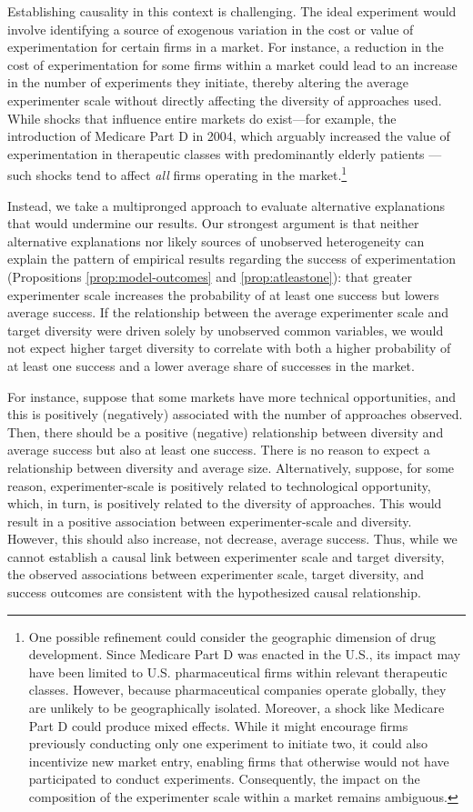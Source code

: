 Establishing causality in this context is challenging. The ideal experiment would involve identifying a source of exogenous variation in the cost or value of experimentation for certain firms in a market. For instance, a reduction in the cost of experimentation for some firms within a market could lead to an increase in the number of experiments they initiate, thereby altering the average experimenter scale without directly affecting the diversity of approaches used. While shocks that influence entire markets do exist---for example, the introduction of Medicare Part D in 2004, which arguably increased the value of experimentation in therapeutic classes with predominantly elderly patients \citep{dranove2022does}---such shocks tend to affect \emph{all} firms operating in the market.\footnote{One possible refinement could consider the geographic dimension of drug development. Since Medicare Part D was enacted in the U.S., its impact may have been limited to U.S. pharmaceutical firms within relevant therapeutic classes. However, because pharmaceutical companies operate globally, they are unlikely to be geographically isolated. Moreover, a shock like Medicare Part D could produce mixed effects. While it might encourage firms previously conducting only one experiment to initiate two, it could also incentivize new market entry, enabling firms that otherwise would not have participated to conduct experiments. Consequently, the impact on the composition of the experimenter scale within a market remains ambiguous.}

Instead, we take a multipronged approach to evaluate alternative explanations that would undermine our results. Our strongest argument is that neither alternative explanations nor likely sources of unobserved heterogeneity can explain the pattern of empirical results regarding the success of experimentation (Propositions \ref{prop:model-outcomes} and \ref{prop:atleastone}):  that greater experimenter scale increases the probability of at least one success but lowers average success. If the relationship between the average experimenter scale and target diversity were driven solely by unobserved common variables, we would not expect higher target diversity to correlate with both a higher probability of at least one success and a lower average share of successes in the market. 

For instance, suppose that some markets have more technical opportunities, and this is positively (negatively) associated with the number of approaches observed. Then, there should be a positive (negative) relationship between diversity and average success but also at least one success. There is no reason to expect a relationship between diversity and average size. Alternatively, suppose, for some reason, experimenter-scale is positively related to technological opportunity, which, in turn, is positively related to the diversity of approaches. This would result in a positive association between experimenter-scale and diversity. However, this should also increase, not decrease, average success. Thus, while we cannot establish a causal link between experimenter scale and target diversity, the observed associations between experimenter scale, target diversity, and success outcomes are consistent with the hypothesized causal relationship.

